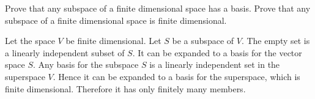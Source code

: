 
\begin{Exercise}[
name={},
title={}, 
difficulty=0,
origin={\cite{JH}}]
\Question Prove that any subspace of a finite dimensional space
        has a basis. 
\Question Prove that any subspace of a finite dimensional space is 
        finite dimensional.
\end{Exercise}

\begin{Answer}
      Let the space $V$ be finite dimensional.
      Let $S$ be a subspace of $V$.
      \Question The empty set is a linearly independent subset of $S$.
          It can be expanded to a basis
          for the vector space $S$. 
      \Question Any basis for the subspace $S$ is a linearly independent 
          set in the superspace $V$.
          Hence it can be expanded to a basis for the superspace, which is
          finite dimensional.
          Therefore it has only finitely many members.  
\end{Answer}
